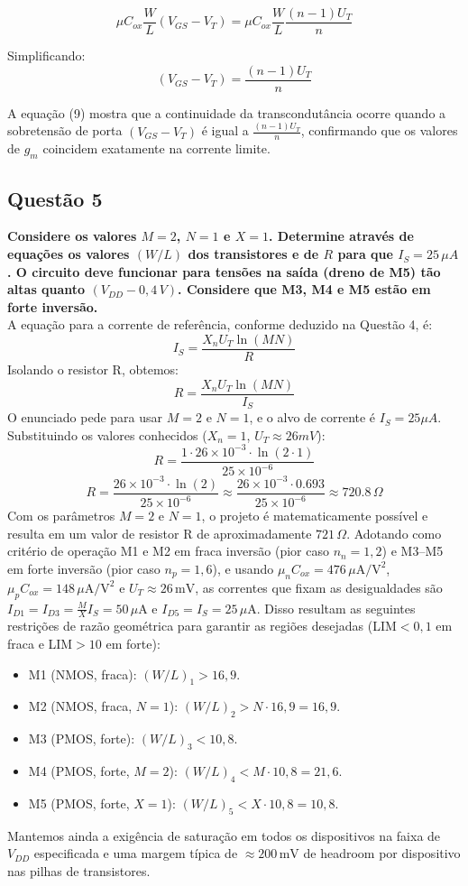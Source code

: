﻿\documentclass[12pt,a4paper]{article}
\begin{document}
$$\mu C_{ox} \frac{W}{L} (V_{GS} - V_T) = \mu C_{ox} \frac{W}{L} \frac{(n-1)U_T}{n}$$

Simplificando:
$$(V_{GS} - V_T) = \frac{(n-1)U_T}{n} $$

A equação (9) mostra que a continuidade da transcondutância ocorre quando a sobretensão de porta $(V_{GS} - V_T)$ é igual a $\frac{(n-1)U_T}{n}$, confirmando que os valores de $g_m$ coincidem exatamente na corrente limite.



\subsection*{Questão 5}
    	\textbf{Considere os valores $M = 2$, $N = 1$ e $X = 1$. Determine através de equações os valores $(W/L)$ dos transistores e de $R$ para que $I_S = 25\,\mu A$. O circuito deve funcionar para tensões na saída (dreno de M5) tão altas quanto $(V_{DD} - 0{,}4\,V)$. Considere que M3, M4 e M5 estão em forte inversão.}\\

A equação para a corrente de referência, conforme deduzido na Questão 4, é:
\[ I_S = \frac{X_n U_T \ln(MN)}{R} \]
Isolando o resistor R, obtemos:
\[ R = \frac{X_n U_T \ln(MN)}{I_S} \]
O enunciado pede para usar $M=2$ e $N=1$, e o alvo de corrente é $I_S = 25\mu A$. Substituindo os valores conhecidos ($X_n=1$, $U_T \approx 26mV$):
\[ R = \frac{1 \cdot 26 \times 10^{-3} \cdot \ln(2 \cdot 1)}{25 \times 10^{-6}} \]
\[ R = \frac{26 \times 10^{-3} \cdot \ln(2)}{25 \times 10^{-6}} \approx \frac{26 \times 10^{-3} \cdot 0.693}{25 \times 10^{-6}} \approx 720.8 \, \Omega \]
Com os parâmetros $M=2$ e $N=1$, o projeto é matematicamente possível e resulta em um valor de resistor R de aproximadamente $721 \, \Omega$. Adotando como critério de operação M1 e M2 em fraca inversão (pior caso $n_n=1{,}2$) e M3–M5 em forte inversão (pior caso $n_p=1{,}6$), e usando $\mu_n C_{ox}=476\,\mu\text{A}/\text{V}^2$, $\mu_p C_{ox}=148\,\mu\text{A}/\text{V}^2$ e $U_T\approx 26\,\text{mV}$, as correntes que fixam as desigualdades são $I_{D1}=I_{D3}=\tfrac{M}{X}I_S=50\,\mu\text{A}$ e $I_{D5}=I_S=25\,\mu\text{A}$. Disso resultam as seguintes restrições de razão geométrica para garantir as regiões desejadas (LIM$<0{,}1$ em fraca e LIM$>10$ em forte):
\begin{itemize}
    \item M1 (NMOS, fraca): $(W/L)_1 > 16{,}9$.
    \item M2 (NMOS, fraca, $N=1$): $(W/L)_2 > N\cdot 16{,}9 = 16{,}9$.
    \item M3 (PMOS, forte): $(W/L)_3 < 10{,}8$.
    \item M4 (PMOS, forte, $M=2$): $(W/L)_4 < M\cdot 10{,}8 = 21{,}6$.
    \item M5 (PMOS, forte, $X=1$): $(W/L)_5 < X\cdot 10{,}8 = 10{,}8$.
\end{itemize}
Mantemos ainda a exigência de saturação em todos os dispositivos na faixa de $V_{DD}$ especificada e uma margem típica de $\approx 200\,\text{mV}$ de headroom por dispositivo nas pilhas de transistores.
\end{document}
